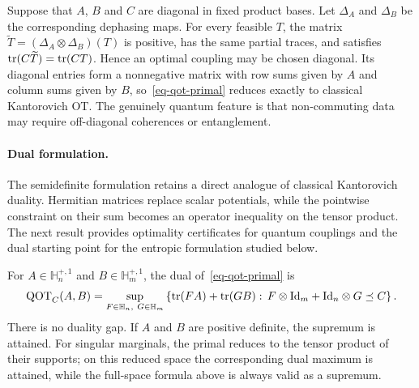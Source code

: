 \begin{example}\label{ex-qot-classical-diagonal-case}
	Suppose that $A$, $B$ and $C$ are diagonal in fixed product bases. Let $\Delta_A$ and $\Delta_B$ be the corresponding dephasing maps. For every feasible $T$, the matrix $\widetilde T=(\Delta_A\otimes\Delta_B)(T)$ is positive, has the same partial traces, and satisfies $\operatorname{tr}(C\widetilde T)=\operatorname{tr}(CT)$. Hence an optimal coupling may be chosen diagonal. Its diagonal entries form a nonnegative matrix with row sums given by $A$ and column sums given by $B$, so~\eqref{eq-qot-primal} reduces exactly to classical Kantorovich OT\@. The genuinely quantum feature is that non-commuting data may require off-diagonal coherences or entanglement.
\end{example}

\paragraph{Dual formulation.}
The semidefinite formulation retains a direct analogue of classical Kantorovich duality. Hermitian matrices replace scalar potentials, while the pointwise constraint on their sum becomes an operator inequality on the tensor product. The next result provides optimality certificates for quantum couplings and the dual starting point for the entropic formulation studied below.

\begin{prop}\label{prop-qot-duality}
	For $A\in\mathbb H_n^{+,1}$ and $B\in\mathbb H_m^{+,1}$, the dual of~\eqref{eq-qot-primal} is
	\begin{equation}\label{eq-qot-dual}
		\mathrm{QOT}_C(A,B)
		=
		\sup_{F\in\mathbb H_n,\ G\in\mathbb H_m}
		\left\{
			\operatorname{tr}(FA)+\operatorname{tr}(GB)
			:\,
			F\otimes\mathrm{Id}_m+\mathrm{Id}_n\otimes G\preceq C
		\right\}.
	\end{equation}
	There is no duality gap. If $A$ and $B$ are positive definite, the supremum is attained. For singular marginals, the primal reduces to the tensor product of their supports; on this reduced space the corresponding dual maximum is attained, while the full-space formula above is always valid as a supremum.
\end{prop}

